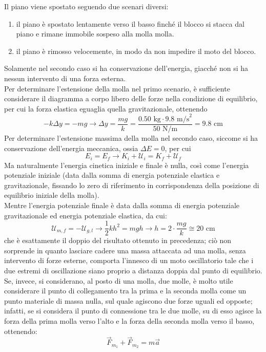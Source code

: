 \documentclass[a4paper]{extarticle}
\begin{document}
 Il piano viene spostato seguendo due scenari diversi:
\begin{enumerate}
  \item il piano è spostato lentamente verso il basso finché il blocco si stacca dal piano e rimane immobile sospeso alla molla molla.
  \item il piano è rimosso velocemente, in modo da non impedire il moto del blocco.
\end{enumerate}
Solamente nel secondo caso si ha conservazione dell'energia, giacché non si ha nessun intervento di una forza esterna.\\
Per determinare l'estensione della molla nel primo scenario, è sufficiente considerare il diagramma a corpo libero delle forze nella condizione di equilibrio, per cui la forza elastica eguaglia quella gravitazionale, ottenendo
\[-k \Delta y = - mg \longrightarrow \Delta y = \frac{mg}{k} = \frac{0.50 \text{ kg} \cdot 9.8 \text{ m/s}^2}{50 \text{ N/m}} = 9.8 \text{ cm}\]
Per determinare l'estensione massima della molla nel secondo caso, siccome si ha conservazione dell'energia meccanica, ossia $\Delta E=0$, per cui
\[E_i = E_f \longrightarrow K_i + \mathcal{U}_i = K_f + \mathcal{U}_f\]
Ma naturalmente l'energia cinetica iniziale e finale è nulla, così come l'energia potenziale iniziale (data dalla somma di energia potenziale elastica e gravitazionale, fissando lo zero di riferimento in corrispondenza della posizione di equilibrio iniziale della molla).\\
Mentre l'energia potenziale finale è data dalla somma di energia potenziale gravitazionale ed energia potenziale elastica, da cui:
\[\mathcal{U}_{m,f}=-\mathcal{U}_{g,l} \longrightarrow \frac{1}{2}k h^2 = m g h \longrightarrow h = 2 \cdot \frac{mg}{k} \cong 20 \text{ cm}\]
che è esattamente il doppio del risultato ottenuto in precedenza; ciò non sorprende in quanto lasciare cadere una massa attaccata ad una molla, senza intervento di forze esterne, comporta l'innesco di un moto oscillatorio tale che i due estremi di oscillazione siano proprio a distanza doppia dal punto di equilibrio.\\
Se, invece, si considerano, al posto di una molla, due molle, è molto utile considerare il punto di collegamento tra la prima e la seconda molla come un punto materiale di massa nulla, sul quale agiscono due forze uguali ed opposte; infatti, se si considera il punto di connessione tra le due molle, su di esso agisce la forza della prima molla verso l'alto e la forza della seconda molla verso il basso, ottenendo:
\[\vec F_{m_1} + \vec F_{m_2} = m \vec a\]
\end{document}
